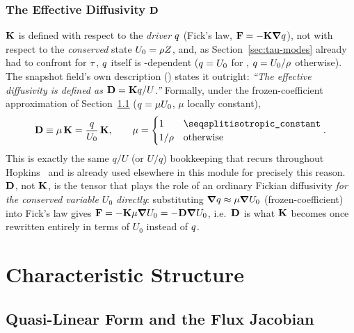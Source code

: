 \subsubsection{The Effective Diffusivity $\mathbf{D}$}
\label{sec:effective-diffusivity}
$\mathbf{K}$ is defined with respect to the \emph{driver} $q$ (Fick's
law, $\mathbf{F}=-\mathbf{K}\grad q$), not with respect to the
\emph{conserved} state $U_0=\rho Z$, and, as Section~\ref{sec:tau-modes}
already had to confront for $\tau$, $q$ itself is
-dependent ($q=U_0$ for
, $q=U_0/\rho$ otherwise). The 
snapshot field's own description () states it
outright: \emph{``The effective diffusivity is defined as $\mathbf{D} =
\mathbf{K}q/U$.''} Formally, under the frozen-coefficient approximation
of Section~\ref{sec:quasilinear} ($q=\mu U_0$, $\mu$ locally
constant),
\begin{equation}
  \label{eq:D_definition}
  \Deff \equiv \mu\,\Kmat = \frac{\driver}{U_0}\,\Kmat ,
  \qquad
  \mu = \begin{cases} 1 & \code{isotropic\_constant} \\ 1/\rho & \text{otherwise} \end{cases} .
\end{equation}
This is exactly the same $q/U$ (or $U/q$) bookkeeping that recurs
throughout Hopkins~\citeyear{Hopkins2017diffusion} and is already used
elsewhere in this module for precisely this reason. $\mathbf{D}$, not $\mathbf{K}$, is the tensor that
plays the role of an ordinary Fickian diffusivity \emph{for the conserved
variable $U_0$ directly}: substituting $\grad q\approx\mu\grad U_0$
(frozen-coefficient) into Fick's law gives $\mathbf{F}=-\mathbf{K}\mu\grad U_0 =
-\mathbf{D}\grad U_0$, i.e.\ $\mathbf{D}$ is what $\mathbf{K}$ becomes once rewritten
entirely in terms of $U_0$ instead of $q$. 

\section{Characteristic Structure}

\subsection{Quasi-Linear Form and the Flux Jacobian}
\label{sec:quasilinear}

